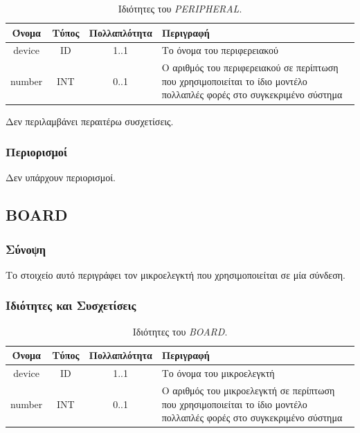 \begin{table}[H]
	\begin{center}
		\caption{Ιδιότητες του \textit{PERIPHERAL}.}
		\label{tab:peripheral_con}
		\begin{tabular}{ | c | c | c| m{5.5cm} | }
			\hline
			\rowcolor{Gray}
			Όνομα & Τύπος & Πολλαπλότητα & Περιγραφή \\
			\hline
			device & ID & 1..1 & Το όνομα του περιφερειακού \\
			\hline
		    number & INT & 0..1 & Ο αριθμός του περιφερειακού σε περίπτωση που χρησιμοποιείται το ίδιο μοντέλο πολλαπλές φορές στο συγκεκριμένο σύστημα \\
			\hline
		\end{tabular}
	\end{center}
\end{table}

\noindent Δεν περιλαμβάνει περαιτέρω συσχετίσεις.

\subsubsection*{Περιορισμοί}

\noindent Δεν υπάρχουν περιορισμοί.

\subsection{BOARD}
\label{subsec:board_con}

\subsubsection*{Σύνοψη}

\noindent Το στοιχείο αυτό περιγράφει τον μικροελεγκτή που χρησιμοποιείται σε μία σύνδεση.

\subsubsection*{Ιδιότητες και Συσχετίσεις}

\begin{table}[H]
	\begin{center}
		\caption{Ιδιότητες του \textit{BOARD}.}
		\label{tab:board_con}
		\begin{tabular}{ | c | c | c| m{5.5cm} | }
			\hline
			\rowcolor{Gray}
			Όνομα & Τύπος & Πολλαπλότητα & Περιγραφή \\
			\hline
			device & ID & 1..1 & Το όνομα του μικροελεγκτή \\
			\hline
			number & INT & 0..1 & Ο αριθμός του μικροελεγκτή σε περίπτωση που χρησιμοποιείται το ίδιο μοντέλο πολλαπλές φορές στο συγκεκριμένο σύστημα \\
			\hline
		\end{tabular}
	\end{center}
\end{table}

